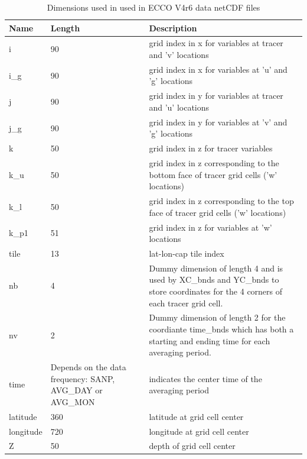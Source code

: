 \begin{longtable}{|p{}|p{}|m{}|}
\caption{Dimensions used in used in ECCO V4r6 data netCDF files}
\label{tab:variable-attributes} \\ 
\hline \endfirsthead
\endhead
\endfoot
\hline \endlastfoot
\rowcolor{blue!25} \textbf{Name} & \textbf{Length} & \textbf{Description} \\ \hline
\rowcolor{magenta!25}
i & 90 & grid index in x for variables at tracer and 'v' locations \\ \hline
\rowcolor{magenta!25}
i\_g & 90 & grid index in x for variables at 'u' and 'g' locations \\ \hline
\rowcolor{magenta!25}
j & 90 & grid index in y for variables at tracer and 'u' locations \\ \hline
\rowcolor{magenta!25}
j\_g & 90 & grid index in y for variables at 'v' and 'g' locations \\ \hline
\rowcolor{magenta!25}
k & 50 & grid index in z for tracer variables \\ \hline
\rowcolor{magenta!25}
k\_u & 50 & grid index in z corresponding to the bottom face of tracer grid cells ('w' locations) \\ \hline
\rowcolor{magenta!25}
k\_l & 50 & grid index in z corresponding to the top face of tracer grid cells ('w' locations) \\ \hline
\rowcolor{magenta!25}
k\_p1 & 51 & grid index in z for variables at 'w' locations \\ \hline
\rowcolor{magenta!25}
tile & 13 & lat-lon-cap tile index \\ \hline
\rowcolor{magenta!25}
nb & 4 & Dummy dimension of length 4 and is used by XC\_bnds and YC\_bnds to store coordinates for the 4 corners of each tracer grid cell. \\ \hline
\rowcolor{magenta!25}
nv & 2 & Dummy dimension of length 2 for the coordiante time\_bnds which has both a starting and ending time for each averaging period. \\ \hline
\rowcolor{magenta!25}
time & Depends on the data frequency: SANP, AVG\_DAY or AVG\_MON & indicates the center time of the averaging period \\ \hline
\rowcolor{magenta!25}
latitude & 360 & latitude at grid cell center \\ \hline
\rowcolor{magenta!25}
longitude & 720 & longitude at grid cell center \\ \hline
\rowcolor{magenta!25}
Z & 50 & depth of grid cell center \\ \hline
\end{longtable}
